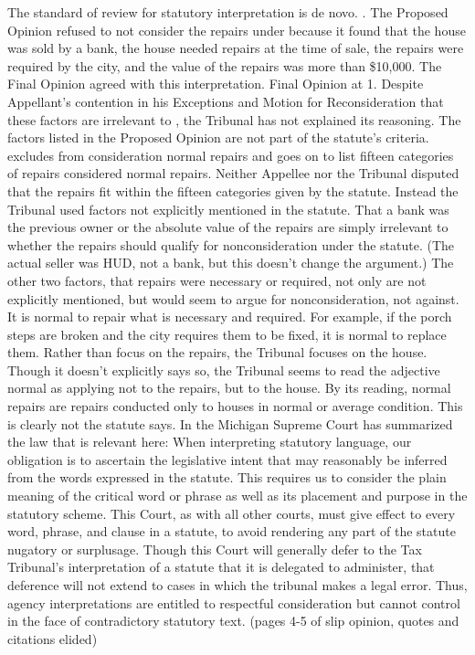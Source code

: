The standard of review for statutory interpretation is de novo.  .
The Proposed Opinion refused to not consider the repairs under  because it found that the house was sold by a bank, the house needed repairs at the time of sale, the repairs were required by the city, and the value of the repairs was more than \$10,000. The Final Opinion agreed with this interpretation. Final Opinion at 1.  Despite Appellant's contention in his Exceptions and Motion for Reconsideration that these factors are irrelevant to , the Tribunal has not explained its reasoning. 
The factors listed in the Proposed Opinion are not part of the statute's criteria.  excludes from consideration normal repairs and goes on to list fifteen categories of repairs considered normal repairs. Neither Appellee nor the Tribunal disputed that the repairs fit within the fifteen categories given by the statute. Instead the Tribunal used factors not explicitly mentioned in the statute. That a bank was the previous owner or the absolute value of the repairs are simply irrelevant to whether the repairs should qualify for nonconsideration under the statute. (The actual seller was HUD, not a bank, but this doesn't change the argument.) The other two factors, that repairs were necessary or required, not only are not explicitly mentioned, but would seem to argue for nonconsideration, not against. It is normal to repair what is necessary and required. For example, if the porch steps are broken and the city requires them to be fixed, it is normal to replace them. 
Rather than focus on the repairs, the Tribunal focuses on the house. Though it doesn't explicitly says so, the Tribunal seems to read the adjective normal as applying not to the repairs, but to the house. By its reading, normal repairs are repairs conducted only to houses in normal or average condition. This is clearly not the statute says.
In \cite{SBC Health Midwest} the Michigan Supreme Court has summarized the law that is relevant here: 
When interpreting statutory language, our obligation is to ascertain the legislative intent that may reasonably be inferred from the words expressed in the statute. This requires us to consider the plain meaning of the critical word or phrase as well as its placement and purpose in the statutory scheme. This Court, as with all other courts, must give effect to every word, phrase, and clause in a statute, to avoid rendering any part of the statute nugatory or surplusage. Though this Court will generally defer to the Tax Tribunal's interpretation of a statute that it is delegated to administer, that deference will not extend to cases in which the tribunal makes a legal error. Thus, agency interpretations are entitled to respectful consideration but cannot control in the face of contradictory statutory text. (pages 4-5 of slip opinion, quotes and citations elided)
 
